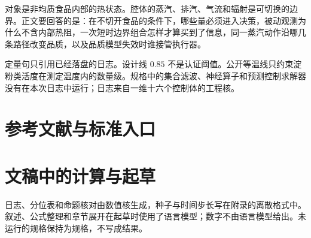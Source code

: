 

\maketitle
\thispagestyle{empty}

\noindent
对象是非均质食品内部的热状态。腔体的蒸汽、排汽、气流和辐射是可切换的边界。正文要回答的是：在不切开食品的条件下，哪些量必须进入决策，被动观测为什么不含内部热阻，一次短时边界组合怎样才算买到了信息，同一蒸汽动作沿哪几条路径改变品质，以及品质模型失效时谁接管执行器。

定量句只引用已经落盘的日志。设计线 \(0.85\) 不是认证阈值。公开等温线只约束淀粉类活度在测定温度内的数量级。规格中的集合滤波、神经算子和预测控制求解器没有在本次日志中运行；日志来自一维十六个控制体的工程核。

\tableofcontents
\clearpage




















\chapter*{参考文献与标准入口}


\appendix





\chapter*{文稿中的计算与起草}
\noindent
日志、分位表和命题核对由数值核生成，种子与时间步长写在附录的离散格式中。叙述、公式整理和章节展开在起草时使用了语言模型；数字不由语言模型给出。未运行的规格保持为规格，不写成结果。


